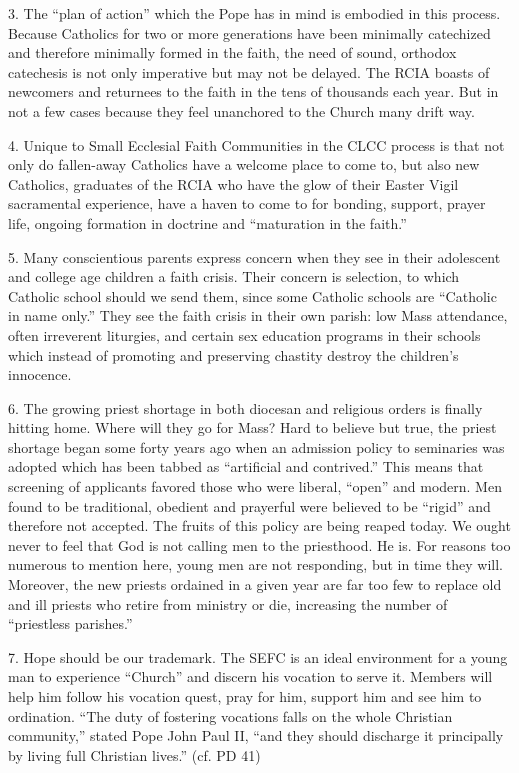 \documentclass[oneside]{book}
\begin{document}
3. The ``plan of action'' which the Pope has in mind is embodied in this
process. Because Catholics for two or more generations have been minimally
catechized and therefore minimally formed in the faith, the need of sound,
orthodox catechesis is not only imperative but may not be delayed. The RCIA
boasts of newcomers and returnees to the faith in the tens of thousands each
year. But in not a few cases because they feel unanchored to the Church many
drift way.

4. Unique to Small Ecclesial Faith Communities in the CLCC process is that not
only do fallen-away Catholics have a welcome place to come to, but also new
Catholics, graduates of the RCIA who have the glow of their Easter Vigil
sacramental experience, have a haven to come to for bonding, support, prayer
life, ongoing formation in doctrine and ``maturation in the faith.''

5. Many conscientious parents express concern when they see in their adolescent
and college age children a faith crisis. Their concern is selection, to which
Catholic school should we send them, since some Catholic schools are ``Catholic
in name only.'' They see the faith crisis in their own parish: low Mass
attendance, often irreverent liturgies, and certain sex education programs in
their schools which instead of promoting and preserving chastity destroy the
children's innocence.

6. The growing priest shortage in both diocesan and religious orders is finally
hitting home. Where will they go for Mass? Hard to believe but true, the priest
shortage began some forty years ago when an admission policy to seminaries was
adopted which has been tabbed as ``artificial and contrived.'' This means that
screening of applicants favored those who were liberal, ``open'' and modern. Men
found to be traditional, obedient and prayerful were believed to be ``rigid''
and therefore not accepted. The fruits of this policy are being reaped today. We
ought never to feel that God is not calling men to the priesthood. He is. For
reasons too numerous to mention here, young men are not responding, but in time
they will. Moreover, the new priests ordained in a given year are far too few to
replace old and ill priests who retire from ministry or die, increasing the
number of ``priestless parishes.''

7. Hope should be our trademark. The SEFC is an ideal environment for a young
man to experience ``Church'' and discern his vocation to serve it. Members will
help him follow his vocation quest, pray for him, support him and see him to
ordination. ``The duty of fostering vocations falls on the whole Christian
community,'' stated Pope John Paul II, ``and they should discharge it
principally by living full Christian lives.'' (cf. PD 41)
\end{document}
